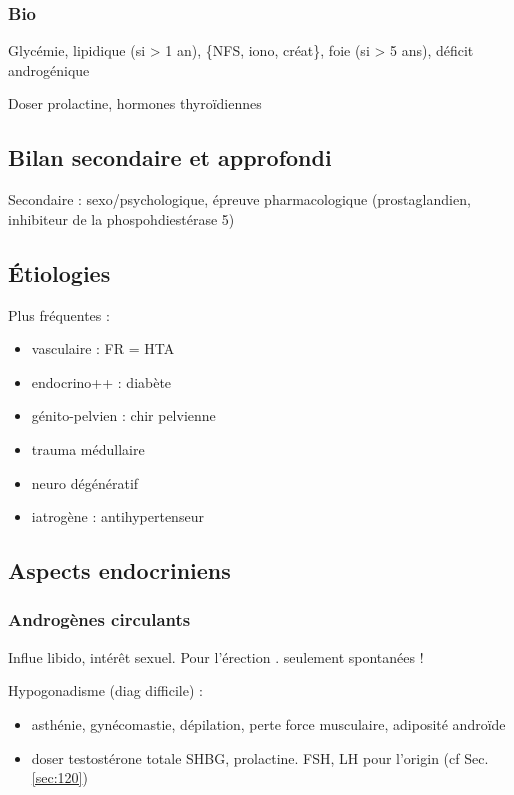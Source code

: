 \documentclass[11pt]{article}
\begin{document}
\subsubsection{Bio}
\label{sec:org2c2caaa}
Glycémie, lipidique (si > 1 an), \{NFS, iono, créat\}, foie (si > 5 ans), déficit
androgénique

Doser prolactine, hormones thyroïdiennes

\subsection{Bilan secondaire et approfondi}
\label{sec:org0d208ea}
Secondaire : sexo/psychologique, épreuve pharmacologique (prostaglandien,
inhibiteur de la phospohdiestérase 5)

\subsection{Étiologies}
\label{sec:org5fd317a}
Plus fréquentes :
\begin{itemize}
\item vasculaire : FR = HTA
\item endocrino++ : diabète
\item génito-pelvien : chir pelvienne
\item trauma médullaire
\item neuro dégénératif
\item iatrogène : antihypertenseur
\end{itemize}

\subsection{Aspects endocriniens}
\label{sec:org50ca0f9}
\subsubsection{Androgènes circulants}
\label{sec:org9f54a3c}
Influe libido, intérêt sexuel. Pour l'érection . seulement spontanées !

Hypogonadisme (diag difficile) : 
\begin{itemize}
\item asthénie, gynécomastie, dépilation, perte force musculaire, adiposité androïde
\item doser testostérone totale \textpm{} SHBG, prolactine. FSH, LH pour l'origin (cf
Sec. \ref{sec:120})
\end{itemize}
\end{document}
